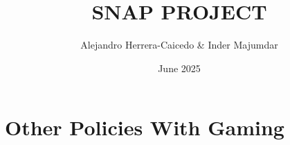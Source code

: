 \documentclass[11.5pt]{article}
\title{SNAP PROJECT}
\author{Alejandro Herrera-Caicedo \& Inder Majumdar}
\date{June 2025}
\begin{document}
\maketitle
\begin{abstract}
  
    
\end{abstract}











\section{Other Policies With Gaming}
\end{document}
